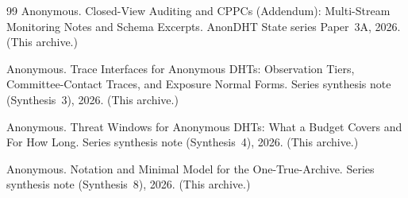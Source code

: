 \documentclass[11pt]{article}
\begin{document}
\begin{thebibliography}{99}
Anonymous.
\newblock Closed-View Auditing and CPPCs (Addendum): Multi-Stream Monitoring Notes and Schema Excerpts.
\newblock AnonDHT State series Paper~3A, 2026. (This archive.)

Anonymous.
\newblock Trace Interfaces for Anonymous {DHT}s: Observation Tiers, Committee-Contact Traces, and Exposure Normal Forms.
\newblock Series synthesis note (Synthesis~3), 2026. (This archive.)

Anonymous.
\newblock Threat Windows for Anonymous {DHT}s: What a Budget Covers and For How Long.
\newblock Series synthesis note (Synthesis~4), 2026. (This archive.)


Anonymous.
\newblock Notation and Minimal Model for the One-True-Archive.
\newblock Series synthesis note (Synthesis~8), 2026. (This archive.)

\end{thebibliography}
\end{document}
